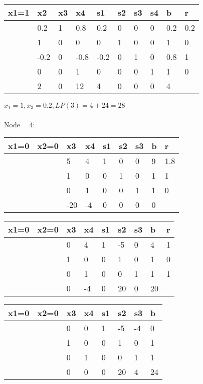 \documentclass{article} %
\numberwithin{equation}{section} %
\numberwithin{figure}{section} %
\numberwithin{table}{section} %
\begin{document}
\begin{center}
\begin{tabular}{|l|l|l|l|l|l|l|l|l|l|}
\hline
x1=1 & x2   & x3 & x4   & s1   & s2 & s3 & s4 & b   & r   \\ \hline
     & 0.2  & 1  & 0.8  & 0.2  & 0  & 0  & 0  & 0.2 & 0.2 \\ \hline
     & 1    & 0  & 0    & 0    & 1  & 0  & 0  & 1   & 0   \\ \hline
     & -0.2 & 0  & -0.8 & -0.2 & 0  & 1  & 0  & 0.8 & 1   \\ \hline
     & 0    & 0  & 1    & 0    & 0  & 0  & 1  & 1   & 0   \\ \hline
     & 2    & 0  & 12   & 4    & 0  & 0  & 0  & 4   &     \\ \hline
\end{tabular}
\end{center}
$x_1=1,x_3=0.2,LP(3)=4+24=28$
\\
\\
Node \ \ 4:
\begin{center}
\begin{tabular}{|l|l|l|l|l|l|l|l|l|}
\hline
x1=0 & x2=0 & x3  & x4 & s1 & s2 & s3 & b & r   \\ \hline
     &      & 5   & 4  & 1  & 0  & 0  & 9 & 1.8 \\ \hline
     &      & 1   & 0  & 0  & 1  & 0  & 1 & 1   \\ \hline
     &      & 0   & 1  & 0  & 0  & 1  & 1 & 0   \\ \hline
     &      & -20 & -4 & 0  & 0  & 0  & 0 &     \\ \hline
\end{tabular}
\end{center}
\begin{center}
\begin{tabular}{|l|l|l|l|l|l|l|l|l|}
\hline
x1=0 & x2=0 & x3 & x4 & s1 & s2 & s3 & b  & r \\ \hline
     &      & 0  & 4  & 1  & -5 & 0  & 4  & 1 \\ \hline
     &      & 1  & 0  & 0  & 1  & 0  & 1  & 0 \\ \hline
     &      & 0  & 1  & 0  & 0  & 1  & 1  & 1 \\ \hline
     &      & 0  & -4 & 0  & 20 & 0  & 20 &   \\ \hline
\end{tabular}
\end{center}
\begin{center}
\begin{tabular}{|l|l|l|l|l|l|l|l|}
\hline
x1=0 & x2=0 & x3 & x4 & s1 & s2 & s3 & b  \\ \hline
     &      & 0  & 0  & 1  & -5 & -4 & 0  \\ \hline
     &      & 1  & 0  & 0  & 1  & 0  & 1  \\ \hline
     &      & 0  & 1  & 0  & 0  & 1  & 1  \\ \hline
     &      & 0  & 0  & 0  & 20 & 4  & 24 \\ \hline
\end{tabular}
\end{center}
\end{document}
